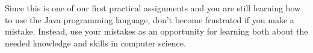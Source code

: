 Since this is one of our first practical assignments and you are still learning how to use the Java programming
language, don't become frustrated if you make a mistake. Instead, use your mistakes as an opportunity for learning both
about the needed knowledge and skills in computer science.










